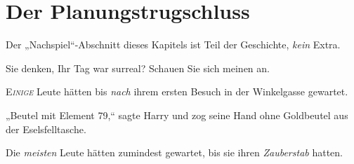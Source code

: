 \chapter{Der Planungstrugschluss}

\begin{chapterOpeningAuthorNote}
% 
Der „Nachspiel“-Abschnitt dieses Kapitels ist Teil der Geschichte, \emph{kein} Extra.
\end{chapterOpeningAuthorNote}
\begin{chapterOpeningQuote}
Sie denken, Ihr Tag war surreal? Schauen Sie sich meinen an.
\end{chapterOpeningQuote}

\lettrine{E}{\emph{inige}} Leute hätten bis \emph{nach} ihrem ersten Besuch in der Winkelgasse gewartet.

„Beutel mit Element 79,“ sagte Harry und zog seine Hand ohne Goldbeutel aus der Eselsfelltasche.

Die \emph{meisten} Leute hätten zumindest gewartet, bis sie ihren \emph{Zauberstab} hatten.

